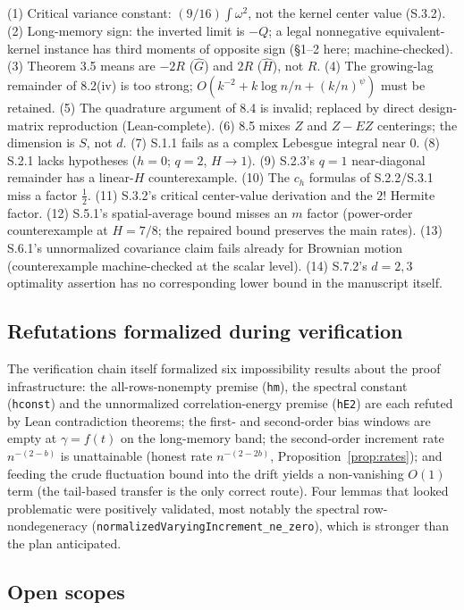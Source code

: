 \documentclass[11pt]{article}
\theoremstyle{definition}
\theoremstyle{remark}
\begin{document}
(1) Critical variance constant: $(9/16)\int\omega^2$, not the kernel center value
(S.3.2). (2) Long-memory sign: the inverted limit is $-Q$; a legal nonnegative
equivalent-kernel instance has third moments of opposite sign (\S1--2 here;
machine-checked). (3) Theorem 3.5 means are $-2R$ ($\widehat G$) and $2R$
($\widehat H$), not $R$. (4) The growing-lag remainder of 8.2(iv) is too strong;
$O(k^{-2}+k\log n/n+(k/n)^{\psi})$ must be retained. (5) The quadrature argument
of 8.4 is invalid; replaced by direct design-matrix reproduction (Lean-complete).
(6) 8.5 mixes $Z$ and $Z-EZ$ centerings; the dimension is $S$, not $d$. (7) S.1.1
fails as a complex Lebesgue integral near $0$. (8) S.2.1 lacks hypotheses
($h=0$; $q=2$, $H\to1$). (9) S.2.3's $q=1$ near-diagonal remainder has a
linear-$H$ counterexample. (10) The $c_h$ formulas of S.2.2/S.3.1 miss a factor
$\tfrac12$. (11) S.3.2's critical center-value derivation and the $2!$ Hermite
factor. (12) S.5.1's spatial-average bound misses an $m$ factor (power-order
counterexample at $H=7/8$; the repaired bound preserves the main rates). (13)
S.6.1's unnormalized covariance claim fails already for Brownian motion
(counterexample machine-checked at the scalar level). (14) S.7.2's $d=2,3$
optimality assertion has no corresponding lower bound in the manuscript itself.

\subsection{Refutations formalized during verification}

The verification chain itself formalized six impossibility results about the
proof infrastructure: the all-rows-nonempty premise (\texttt{hm}), the spectral
constant (\texttt{hconst}) and the unnormalized correlation-energy premise
(\texttt{hE2}) are each refuted by Lean contradiction theorems; the first- and
second-order bias windows are empty at $\gamma=f(t)$ on the long-memory band;
the second-order increment rate $n^{-(2-b)}$ is unattainable (honest rate
$n^{-(2-2b)}$, Proposition~\ref{prop:rates}); and feeding the crude fluctuation
bound into the drift yields a non-vanishing $O(1)$ term (the tail-based
transfer is the only correct route). Four lemmas that looked problematic were
positively validated, most notably the spectral row-nondegeneracy
(\texttt{normalizedVaryingIncrement\_ne\_zero}), which is stronger than the
plan anticipated.

\subsection{Open scopes}
\end{document}
